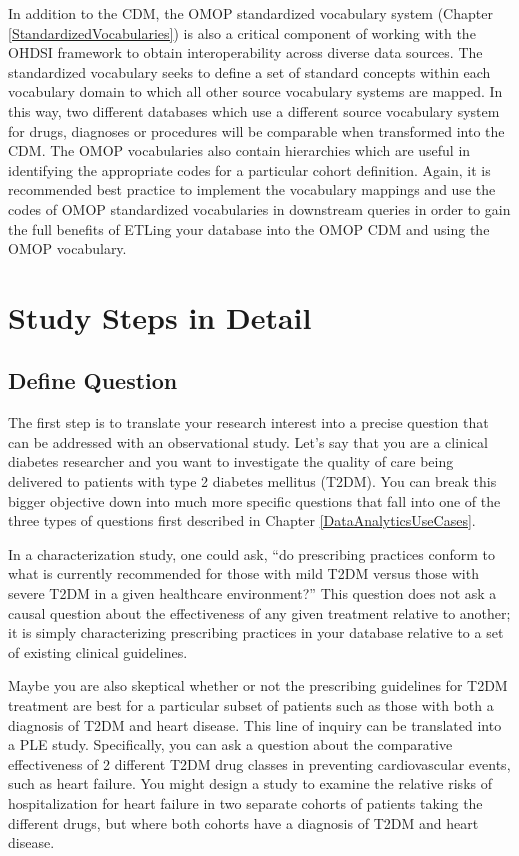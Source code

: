 \documentclass[11pt]{book}
\theoremstyle{definition}
\theoremstyle{definition}
\theoremstyle{definition}
\theoremstyle{remark}
\begin{document}
In addition to the CDM, the OMOP standardized vocabulary system (Chapter
\ref{StandardizedVocabularies}) is also a critical component of working
with the OHDSI framework to obtain interoperability across diverse data
sources. The standardized vocabulary seeks to define a set of standard
concepts within each vocabulary domain to which all other source
vocabulary systems are mapped. In this way, two different databases
which use a different source vocabulary system for drugs, diagnoses or
procedures will be comparable when transformed into the CDM. The OMOP
vocabularies also contain hierarchies which are useful in identifying
the appropriate codes for a particular cohort definition. Again, it is
recommended best practice to implement the vocabulary mappings and use
the codes of OMOP standardized vocabularies in downstream queries in
order to gain the full benefits of ETLing your database into the OMOP
CDM and using the OMOP vocabulary.

\section{Study Steps in Detail}\label{study-steps-in-detail}

\subsection{Define Question}\label{define-question}

The first step is to translate your research interest into a precise
question that can be addressed with an observational study. Let's say
that you are a clinical diabetes researcher and you want to investigate
the quality of care being delivered to patients with type 2 diabetes
mellitus (T2DM). You can break this bigger objective down into much more
specific questions that fall into one of the three types of questions
first described in Chapter \ref{DataAnalyticsUseCases}.

In a characterization study, one could ask, ``do prescribing practices
conform to what is currently recommended for those with mild T2DM versus
those with severe T2DM in a given healthcare environment?'' This
question does not ask a causal question about the effectiveness of any
given treatment relative to another; it is simply characterizing
prescribing practices in your database relative to a set of existing
clinical guidelines.

Maybe you are also skeptical whether or not the prescribing guidelines
for T2DM treatment are best for a particular subset of patients such as
those with both a diagnosis of T2DM and heart disease. This line of
inquiry can be translated into a PLE study. Specifically, you can ask a
question about the comparative effectiveness of 2 different T2DM drug
classes in preventing cardiovascular events, such as heart failure. You
might design a study to examine the relative risks of hospitalization
for heart failure in two separate cohorts of patients taking the
different drugs, but where both cohorts have a diagnosis of T2DM and
heart disease.
\end{document}
